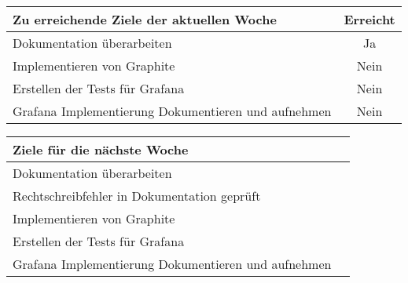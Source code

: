 \begin{tabularx}{\textwidth}{Xc}
    \arrayrulecolor{OliveGreen}
    \toprule
    {\bfseries Zu erreichende Ziele der aktuellen Woche} & {\bfseries Erreicht} \\
    \midrule[2pt]
    Dokumentation überarbeiten                              &Ja              \\
    \rowcolor{OliveGreen!15}
    Implementieren von Graphite                           &Nein              \\
    \rowcolor{White}
    Erstellen der Tests für Grafana                       &Nein              \\
    \rowcolor{OliveGreen!15}
    Grafana Implementierung Dokumentieren und aufnehmen   &Nein              \\
    \bottomrule[2pt]
\end{tabularx}
%
\vspace{1cm}
%
\begin{tabularx}{\textwidth}{Xc}
    \arrayrulecolor{OliveGreen}
    \toprule
    {\bfseries Ziele für die nächste Woche}        &                         \\
    \midrule[2pt]
    Dokumentation überarbeiten                     &                         \\
    \rowcolor{OliveGreen!15}
    Rechtschreibfehler in Dokumentation geprüft   &                          \\
    \rowcolor{White}
    Implementieren von Graphite                           &                  \\
    \rowcolor{OliveGreen!15}
    Erstellen der Tests für Grafana                       &                  \\
    \rowcolor{White}
    Grafana Implementierung Dokumentieren und aufnehmen   &                  \\
\end{tabularx}
